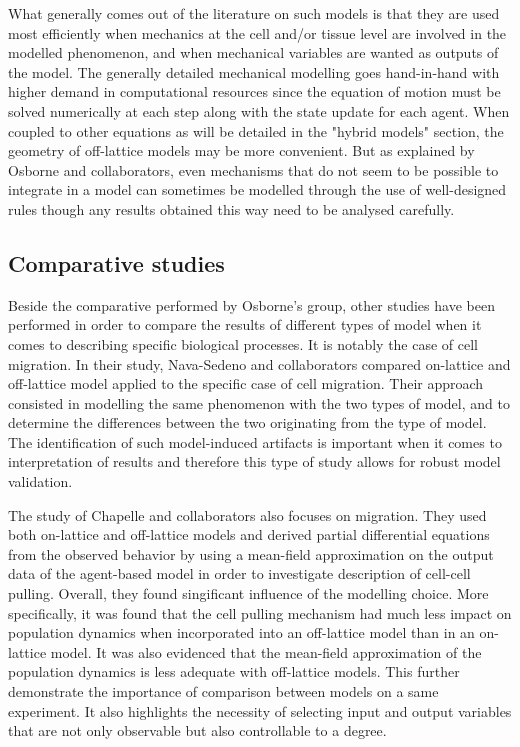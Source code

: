 \documentclass[11pt,a4paper]{article}
\begin{document}
What generally comes out of the literature on such models is that they are used most efficiently when mechanics at the cell and/or tissue level are involved in the modelled phenomenon, and when mechanical variables are wanted as outputs of the model. The generally detailed mechanical modelling goes hand-in-hand with higher demand in computational resources since the equation of motion must be solved numerically at each step along with the state update for each agent. When coupled to other equations as will be detailed in the "hybrid models" section, the geometry of off-lattice models may be more convenient.  But as explained by Osborne and collaborators, even mechanisms that do not seem to be possible to integrate in a model can sometimes be modelled through the use of well-designed rules though any results obtained this way need to be analysed carefully.


\subsection{Comparative studies}
Beside the comparative performed by Osborne's group, other studies have been performed in order to compare the results of different types of model when it comes to describing specific biological processes. It is notably the case of cell migration. In their study, Nava-Sedeno and collaborators compared on-lattice and off-lattice model applied to the specific case of cell migration.\cite{NavaSedeno2020}  Their approach consisted in modelling the same phenomenon with the two types of model, and to determine the differences between the two originating from the type of model. The identification of such model-induced artifacts is important when it comes to interpretation of results and therefore this type of study allows for robust model validation.

The study of Chapelle and collaborators also focuses on migration.\cite{Chapelle2019} They used both on-lattice and off-lattice models and derived partial differential equations from the observed behavior by using a mean-field approximation on the output data of the agent-based model in order to investigate description of cell-cell pulling. Overall, they found singificant influence of the modelling choice. More specifically, it was found that the cell pulling mechanism had much less impact on population dynamics when incorporated into an off-lattice model than in an on-lattice model. It was also evidenced that the mean-field approximation of the population dynamics is less adequate with off-lattice models. This further demonstrate the importance of comparison between models on a same experiment. It also highlights the necessity of selecting input and output variables that are not only observable but also controllable to a degree.
\end{document}
